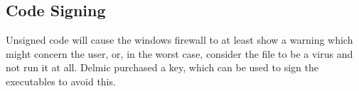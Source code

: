 \documentclass[]{article}
\begin{document}
\subsection{Code Signing}
Unsigned code will cause the windows firewall to at least show a warning which might concern the user, or, in the worst case, consider the file to be a virus and not run it at all. Delmic purchased a key, which can be used to sign the executables to avoid this.
\end{document}
